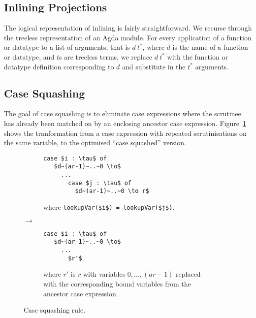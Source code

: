 
\subsection{Inlining Projections}

The logical representation of inlining is fairly straightforward. We recurse through the treeless representation of an Agda module. For every application of a function or datatype to a list of arguments, that is $d~t^*$, where $d$ is the name of a function or datatype, and $t$s are treeless terms, we replace $d~t^*$ with the function or datatype definition corresponding to $d$ and substitute in the $t^*$ arguments.

\subsection{Case Squashing}

The goal of case squashing is to eliminate case expressions where the scrutinee has already been matched on by an enclosing ancestor case expression. Figure~\ref{fig:case_squash_rule} shows the tranformation from a case expression with repeated scrutinisations on the same variable, to the optimised ``case squashed'' version.

\begin{figure}[h]
\centering
\begin{subfigure}{.47\textwidth}
  \centering
  \begin{lstlisting}[style=math]
  case $i : \tau$ of
   $d~(ar-1)~..~0 \to$
     ...
       case $j : \tau$ of
         $d~(ar-1)~..~0 \to r$
  \end{lstlisting}
  where \lstinline[style=math]{lookupVar($i$) = lookupVar($j$)}.
\end{subfigure}
{\large$\to$}
\begin{subfigure}{.47\textwidth}
  \centering
  \begin{lstlisting}[style=math]
  case $i : \tau$ of
   $d~(ar-1)~..~0 \to$
     ...
       $r'$
  \end{lstlisting}
  where $r'$ is $r$ with variables $0, ..., (ar-1)$ replaced with the corresponding bound variables from the ancestor case expression.
\end{subfigure}
\caption{Case squashing rule.}
\label{fig:case_squash_rule}
\end{figure}

